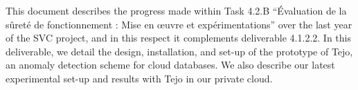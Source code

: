 This document describes the progress made within Task 4.2.B ``Évaluation de la sûreté de fonctionnement : Mise en œuvre et expérimentations''  over the last year of the SVC project,  and in this respect it complements
deliverable 4.1.2.2.  In this deliverable, we detail the design, installation, and set-up of the prototype of Tejo, an anomaly detection scheme for cloud databases. We also describe our latest experimental set-up and results with Tejo in our private cloud.

